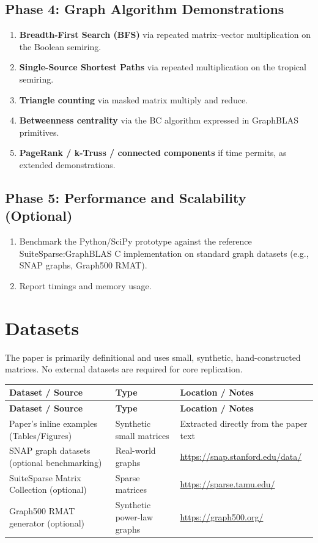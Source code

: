 \documentclass[11pt,a4paper]{article}
\begin{document}
\subsection{Phase 4: Graph Algorithm Demonstrations}
\begin{enumerate}[label=\textbf{4.\arabic*}]
  \item \textbf{Breadth-First Search (BFS)} via repeated matrix--vector multiplication on the Boolean semiring.
  \item \textbf{Single-Source Shortest Paths} via repeated multiplication on the tropical semiring.
  \item \textbf{Triangle counting} via masked matrix multiply and reduce.
  \item \textbf{Betweenness centrality} via the BC algorithm expressed in GraphBLAS primitives.
  \item \textbf{PageRank / k-Truss / connected components} if time permits, as extended demonstrations.
\end{enumerate}

\subsection{Phase 5: Performance and Scalability (Optional)}
\begin{enumerate}[label=\textbf{5.\arabic*}]
  \item Benchmark the Python/SciPy prototype against the reference SuiteSparse:GraphBLAS C implementation on standard graph datasets (e.g., SNAP graphs, Graph500 RMAT).
  \item Report timings and memory usage.
\end{enumerate}

\section{Datasets}
The paper is primarily definitional and uses small, synthetic, hand-constructed matrices. No external datasets are required for core replication.

\begin{longtable}{p{4.5cm} p{3.5cm} p{6cm}}
\toprule
\textbf{Dataset / Source} & \textbf{Type} & \textbf{Location / Notes} \\
\midrule
\endfirsthead
\toprule
\textbf{Dataset / Source} & \textbf{Type} & \textbf{Location / Notes} \\
\midrule
\endhead
Paper's inline examples (Tables/Figures) & Synthetic small matrices & Extracted directly from the paper text \\
\midrule
SNAP graph datasets (optional benchmarking) & Real-world graphs & \url{https://snap.stanford.edu/data/} \\
\midrule
SuiteSparse Matrix Collection (optional) & Sparse matrices & \url{https://sparse.tamu.edu/} \\
\midrule
Graph500 RMAT generator (optional) & Synthetic power-law graphs & \url{https://graph500.org/} \\
\bottomrule
\end{longtable}
\end{document}
